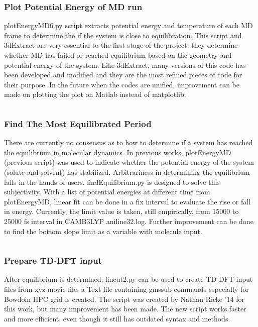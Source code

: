 \documentclass[
journal=jpcbfk, %
manuscript=article]{achemso}
\begin{document}
		\subsubsection{Plot Potential Energy of MD run}
			plotEnergyMD6.py script extracts potential energy and temperature of each MD frame to determine the if the system is close to equilibration. This script and 3dExtract are very essential to the first stage of the project: they determine whether MD has failed or reached equilibrium based on the geometry and potential energy of the system. Like 3dExtract, many versions of this code has been developed and modified and they are the most refined pieces of code for their purpose. In the future when the codes are unified, improvement can be made on plotting the plot on Matlab instead of matplotlib. 
			\inputminted[linenos, breaklines, baselinestretch=1, fontsize=\small]{python}{../pythonScripts/plotEnergyMD6.py} 	
		
		\subsubsection{Find The Most Equilibrated Period}
			There are currently no consensus as to how to determine if a system has reached the equilibrium in molecular dynamics. In previous works, plotEnergyMD (previous script) was used to indicate whether the potential energy of the system (solute and solvent) has stabilized. Arbitrariness in determining the equilibrium falls in the hands of users. findEquilibrium.py is designed to solve this subjectivity. With a list of potential energies at different time from plotEnergyMD, linear fit can be done in a fix interval to evaluate the rise or fall in energy. Currently, the limit value is taken, still empirically, from 15000 to 25000 fs interval in CAMB3LYP aniline32.log. Further improvement can be done to find the bottom slope limit as a variable with molecule input.
			\inputminted[linenos, breaklines, baselinestretch=1, fontsize=\small]{python}{../pythonScripts/findEquilibrium.py} 
		
		\subsubsection{Prepare TD-DFT input}
			After equilibrium is determined, fincut2.py can be used to create TD-DFT input files from xyz-movie file. a Text file containing gmssub commands especially for Bowdoin HPC grid is created. The script was created by Nathan Ricke '14 for this work, but many improvement has been made. The new script works faster and more efficient, even though it still has outdated syntax and methods.
			\inputminted[linenos, breaklines, baselinestretch=1, fontsize=\small]{python}{../pythonScripts/fincut2.py} 
		
\end{document}

